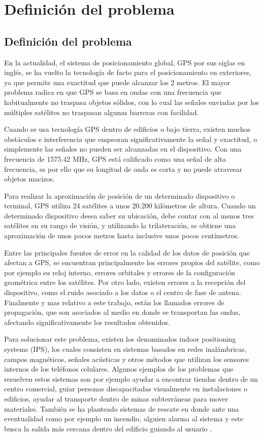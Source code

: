 
\chapter{Definición del problema}

\section{Definición del problema}

En la actualidad, el sistema de posicionamiento global, GPS por sus siglas en inglés, se ha vuelto la tecnología de facto para el posicionamiento en exteriores, ya que permite una exactitud que puede alcanzar los 2 metros. El mayor problema radica en que GPS se basa en ondas con una frecuencia que habitualmente no traspasa objetos sólidos, con lo cual las señales enviadas por los múltiples satélites no traspasan algunas barreras con facilidad.

Cuando se usa tecnología GPS dentro de edificios o bajo tierra, existen muchos obstáculos e interferencia que empeoran significativamente la señal y exactitud, o simplemente las señales no pueden ser alcanzadas en el dispositivo. Con una frecuencia de 1575.42 MHz, GPS está calificado como una señal de alta frecuencia, es por ello que su longitud de onda es corta y no puede atravesar objetos macizos. 

Para realizar la aproximación de posición de un determinado dispositivo o terminal, GPS utiliza 24 satélites a unos 20.200 kilómetros de altura. Cuando un determinado dispositivo desea saber su ubicación, debe contar con al menos tres satélites en su rango de visión, y utilizando la trilateración, se obtiene una aproximación de unos pocos metros hasta inclusive unos pocos centímetros.

Entre las principales fuentes de error en la calidad de los datos de posición que afectan a GPS, se encuentran principalmente los errores propios del satélite, como por ejemplo su reloj interno, errores orbitales y errores de la configuración geométrica entre los satélites. Por otro lado, existen errores a la recepción del dispositivo, como el ruido asociado a los datos o el centro de fase de antena. Finalmente y mas relativo a este trabajo, están los llamados errores de propagación, que son asociados al medio en donde se transportan las ondas, afectando significativamente los resultados obtenidos.

Para solucionar este problema, existen los denominados indoor positioning systems (IPS), los cuales consisten en sistemas basados en redes inalámbricas, campos magnéticos, señales acústicas y otros métodos que utilizan los sensores internos de los teléfonos celulares. Algunos ejemplos de los problemas que resuelven estos sistemas son por ejemplo ayudar a encontrar tiendas dentro de un centro comercial, guiar  personas discapacitadas visualmente en instalaciones o edificios, ayudar al transporte dentro de minas subterráneas para mover materiales. También se ha planteado sistemas de rescate en donde ante una eventualidad como por ejemplo un incendio, alguien alarma al sistema y este busca la salida más cercana dentro del edificio guiando al usuario \citep{5647401}.

